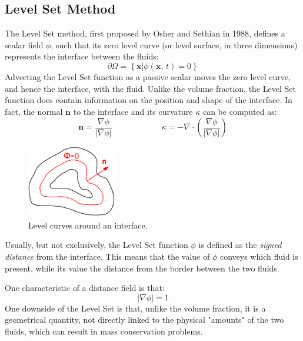 \documentclass[11pt, a4paper, oneside, openany]{book}
\begin{document}
\subsection{Level Set Method}
The Level Set method, first proposed by Osher and Sethian \cite{osher1988fronts} in 1988, defines a scalar field $\phi$, such that its zero level curve (or level surface, in three dimensions) represents the interface between the fluids:
\begin{equation*}
\partial\Omega = \left\{\left.\boldsymbol{x}\right|\phi\left(\boldsymbol{x},\,t\right)=0\right\}\label{ZeroLevelCurve}
\end{equation*}
Advecting the Level Set function as a passive scalar moves the zero level curve, and hence the interface, with the fluid. Unlike the volume fraction, the Level Set function does contain information on the position and shape of the interface. In fact, the normal $\boldsymbol{n}$ to the interface and its curvature $\kappa$ can be computed as:
\begin{equation*}
\boldsymbol{n}=\dfrac{\nabla\phi}{\left|\nabla\phi\right|}\qquad\qquad\qquad \kappa=-\nabla\cdot\left(\dfrac{\nabla\phi}{\left|\nabla\phi\right|}\right)\label{LevelSetNormalCurvature}
\end{equation*}
\begin{figure}[!ht]
	\centering
	\includegraphics[width=0.35\textwidth]{LevelSet.pdf}
	\caption[level Set curve]{Level curves around an interface.}
	\label{LevelSet}
\end{figure}\noindent
Usually, but not exclusively, the Level Set function $\phi$ is defined as the \textit{signed distance} from the interface. This means that the value of $\phi$ conveys which fluid is present, while its value the distance from the border between the two fluids.\par
One characteristic of a distance field is that:
\begin{equation*}
\left|\nabla\phi\right|=1\label{LevelSetGradient}
\end{equation*}
One downside of the Level Set is that, unlike the volume fraction, it is a geometrical quantity, not directly linked to the physical "amounts" of the two fluids, which can result in mass conservation problems.\par
\end{document}

